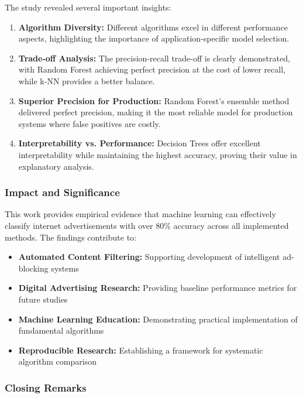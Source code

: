 The study revealed several important insights:

\begin{enumerate}
    \item \textbf{Algorithm Diversity:} Different algorithms excel in different performance aspects, highlighting the importance of application-specific model selection.
    
    \item \textbf{Trade-off Analysis:} The precision-recall trade-off is clearly demonstrated, with Random Forest achieving perfect precision at the cost of lower recall, while k-NN provides a better balance.
    
    \item \textbf{Superior Precision for Production:} Random Forest's ensemble method delivered perfect precision, making it the most reliable model for production systems where false positives are costly.
    
    \item \textbf{Interpretability vs. Performance:} Decision Trees offer excellent interpretability while maintaining the highest accuracy, proving their value in explanatory analysis.
\end{enumerate}

\subsubsection{Impact and Significance}

This work provides empirical evidence that machine learning can effectively classify internet advertisements with over 80\% accuracy across all implemented methods. The findings contribute to:

\begin{itemize}
    \item \textbf{Automated Content Filtering:} Supporting development of intelligent ad-blocking systems
    \item \textbf{Digital Advertising Research:} Providing baseline performance metrics for future studies
    \item \textbf{Machine Learning Education:} Demonstrating practical implementation of fundamental algorithms
    \item \textbf{Reproducible Research:} Establishing a framework for systematic algorithm comparison
\end{itemize}

\subsubsection{Closing Remarks}

